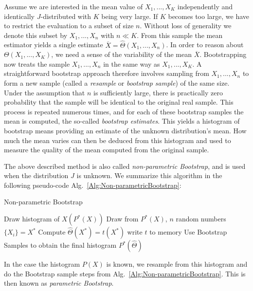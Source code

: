 \documentclass[11pt,a4paper]{article}
\numberwithin{equation}{section}
\begin{document}
%
Assume we are interested in the mean value of $X_1,...,X_K$ independently and identically $J$-distributed with $K$ being very large. 
%
If $K$ becomes too large, we have to restrict the evaluation to a subset of size $n$.
%
Without loss of generality we denote this subset by $X_1,...,X_n$ with $n\ll K$.
%
From this sample the mean estimator yields a single estimate $\overline{X}=\hat \Theta(X_1,...,X_n)$. 
%
In order to reason about $ \Theta(X_1,...,X_K)$, we need a sense of the variability of the mean $\overline{X}$. 
%
Bootstrapping now treats the sample $X_1,...,X_n$ in the same way as $X_1,...,X_K$.
%
A straightforward bootstrap approach therefore involves sampling from $X_1,...,X_n$ to form a new sample (called a {\it resample} or {\it bootstrap sample}) of the same size.
%
Under the assumption that $n$ is sufficiently large, there is practically zero probability that the sample will be identical to the original real sample.
%
This process is repeated numerous times, and for each of these bootstrap samples the mean is computed, the so-called {\it bootstrap estimates}. 
%
This yields a histogram of bootstrap means providing an estimate of the unknown distribution's mean.
%
How much the mean varies can then be deduced from this histogram and used to measure the quality of the mean computed from the original sample. 

%
The above described method is also called {\it non-parametric Bootstrap}, and is used when the distribution $J$ is unknown.
%
We summarize this algorithm in the following pseudo-code Alg.~\eqref{Alg:Non-parametricBootstrap}:
\begin{algorithm}
	\caption{Non-parametric Bootstrap}
	\label{Alg:Non-parametricBootstrap}
	\begin{algorithmic}[1]
		\State Draw histogram of $X(P^*(X))$
		\State Draw from $P^*(X)$, $n$ random numbers $\{X_i\}=X^*$
		\State Compute $\hat \Theta (X^*)=t(X^*)$
		\State write $t$ to memory 
		\EndProcedure
		\State Use Bootstrap Samples to obtain the final histogram $P^*(\hat \Theta)$
		\EndProcedure
	\end{algorithmic}
\end{algorithm}

%
In the case the histogram $P(X)$ is known, we resample from this histogram and do the Bootstrap sample steps from Alg.~\eqref{Alg:Non-parametricBootstrap}. 
%
This is then known as {\it parametric Bootstrap}.
\end{document}
